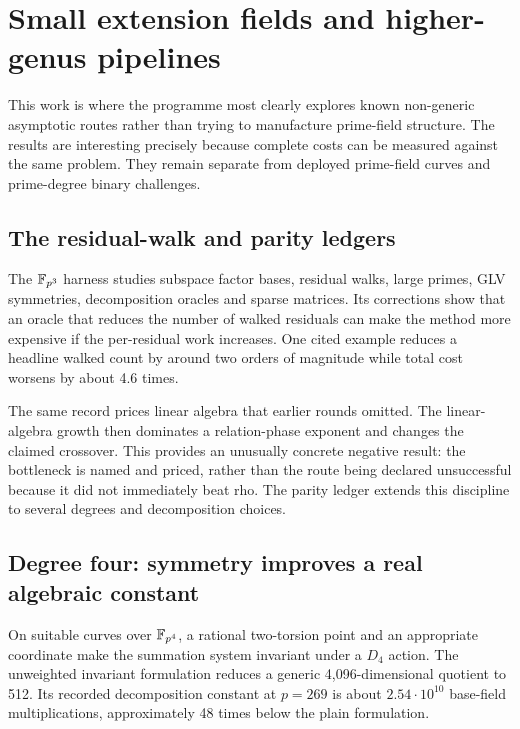 \section{Small extension fields and higher-genus pipelines}\label{sec:extension}

This work is where the programme most clearly explores known
non-generic asymptotic routes rather than trying to manufacture prime-field
structure. The results are interesting precisely because complete costs
can be measured against the same problem. They remain separate from
deployed prime-field curves and prime-degree binary challenges.

\subsection{The residual-walk and parity ledgers}

The $\mathbb F_{p^3}$ harness studies subspace factor bases, residual walks,
large primes, GLV symmetries, decomposition oracles and sparse matrices.
Its corrections show that an oracle that reduces the number of walked
residuals can make the method more expensive if the per-residual work
increases. One cited example reduces a headline walked count by around
two orders of magnitude while total cost worsens by about 4.6 times.

The same record prices linear algebra that earlier rounds omitted. The
linear-algebra growth then dominates a relation-phase exponent and
changes the claimed crossover. This provides an unusually concrete
negative result: the bottleneck is named and priced, rather than the
route being declared unsuccessful because it did not immediately beat
rho. The parity ledger extends this discipline to several degrees and
decomposition choices.

\subsection{Degree four: symmetry improves a real algebraic constant}

On suitable curves over $\mathbb F_{p^4}$, a rational two-torsion point and an
appropriate coordinate make the summation system invariant under a
$D_4$ action. The unweighted invariant formulation reduces a generic
4,096-dimensional quotient to 512. Its recorded decomposition constant
at $p=269$ is about $2.54\cdot10^{10}$ base-field multiplications,
approximately 48 times below the plain formulation.


